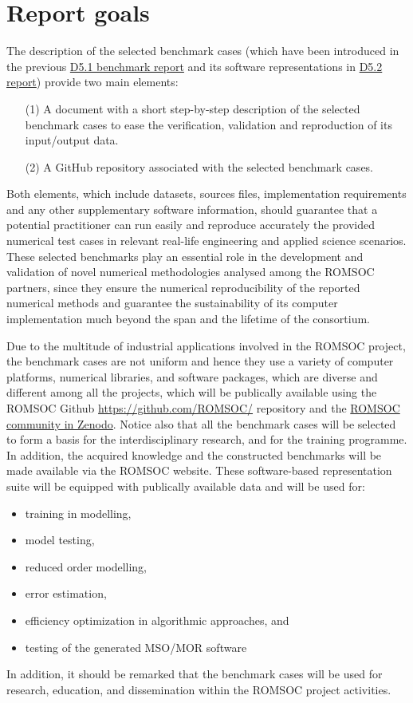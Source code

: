 \section{Report goals}
The description of the selected benchmark cases (which have been introduced in the previous \href{http://doi.org/10.5281/zenodo.3888124}{D5.1 benchmark report} and its software representations in \href{http://doi.org/10.5281/zenodo.3888124}{D5.2 report}) provide two main elements:
\begin{itemize}
\item[(1)] A document with a short step-by-step description of the selected benchmark cases to ease the verification, validation and reproduction of its input/output data.
\item[(2)] A GitHub repository associated with the selected benchmark cases.
\end{itemize}
Both elements, which include datasets, sources files, implementation requirements and any other supplementary software information, should guarantee that a potential practitioner can run easily and reproduce accurately the provided numerical test cases in relevant real-life engineering and applied science scenarios. These selected benchmarks play an essential role in the development and validation of novel numerical methodologies analysed among the \acs{ROMSOC} partners, since they ensure the numerical reproducibility of the reported numerical methods and guarantee the sustainability of its computer implementation much beyond the span and the lifetime of the consortium. 

Due to the multitude of industrial applications involved in the \acs{ROMSOC} project,  the benchmark cases are not uniform and hence they use a variety of computer platforms, numerical libraries, and software packages, which are diverse and different among all the projects, which will be publically available using the ROMSOC Github \url{https://github.com/ROMSOC/} repository and the \href{https://zenodo.org/communities/romsoc}{ROMSOC community in Zenodo}. Notice also that all the benchmark cases will be selected to form a basis for the interdisciplinary research, and for the training programme. In addition, the acquired knowledge and the constructed
benchmarks will be made available via the ROMSOC website. These software-based representation suite will be equipped with publically available data and will be used for: 
\begin{itemize}
\item training in modelling, 
\item model testing, 
\item reduced order modelling, 
\item error estimation, 
\item efficiency optimization in algorithmic approaches, and 
\item testing of the generated MSO/MOR software
\end{itemize}
In addition, it should be remarked that the benchmark cases will be used for research, education, and dissemination within the \acs{ROMSOC} project activities.


